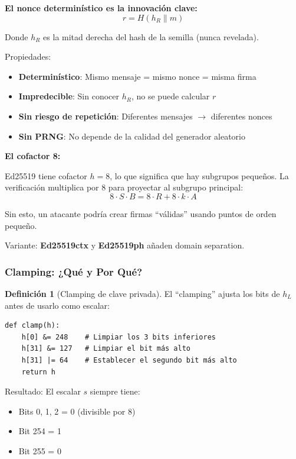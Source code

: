\documentclass[11pt,a4paper,twoside,openright]{book}
\theoremstyle{definition}
\newtheorem{definition}{Definición}[chapter]
\theoremstyle{plain}
\theoremstyle{remark}
\begin{document}
\begin{keyidea}
\textbf{El nonce determinístico es la innovación clave:}
\[ r = H(h_R \| m) \]

Donde $h_R$ es la mitad derecha del hash de la semilla (nunca revelada).

Propiedades:
\begin{itemize}
    \item \textbf{Determinístico}: Mismo mensaje = mismo nonce = misma firma
    \item \textbf{Impredecible}: Sin conocer $h_R$, no se puede calcular $r$
    \item \textbf{Sin riesgo de repetición}: Diferentes mensajes $\to$ diferentes nonces
    \item \textbf{Sin PRNG}: No depende de la calidad del generador aleatorio
\end{itemize}
\end{keyidea}

\begin{advertencia}
\textbf{El cofactor 8:}

Ed25519 tiene cofactor $h = 8$, lo que significa que hay subgrupos pequeños. La verificación multiplica por 8 para proyectar al subgrupo principal:
\[ 8 \cdot S \cdot B = 8 \cdot R + 8 \cdot k \cdot A \]

Sin esto, un atacante podría crear firmas ``válidas'' usando puntos de orden pequeño.

Variante: \textbf{Ed25519ctx} y \textbf{Ed25519ph} añaden domain separation.
\end{advertencia}

\subsubsection{Clamping: ¿Qué y Por Qué?}

\begin{definition}[Clamping de clave privada]
El ``clamping'' ajusta los bits de $h_L$ antes de usarlo como escalar:

\begin{verbatim}
def clamp(h):
    h[0] &= 248    # Limpiar los 3 bits inferiores
    h[31] &= 127   # Limpiar el bit más alto
    h[31] |= 64    # Establecer el segundo bit más alto
    return h
\end{verbatim}

Resultado: El escalar $s$ siempre tiene:
\begin{itemize}
    \item Bits 0, 1, 2 = 0 (divisible por 8)
    \item Bit 254 = 1
    \item Bit 255 = 0
\end{itemize}
\end{definition}
\end{document}
